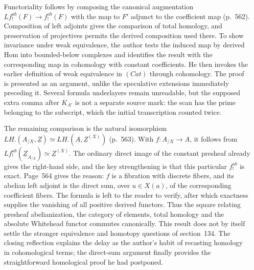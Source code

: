Functoriality follows by composing the canonical augmentation $Lf^{ab}_{!}(F)\to f^{ab}_{!}(F)$ with the map to $F'$ adjunct to the coefficient map (p.~562). Composition of left adjoints gives the comparison of total homology, and preservation of projectives permits the derived composition used there. To show invariance under weak equivalence, the author tests the induced map by derived Hom into bounded-below complexes and identifies the result with the corresponding map in cohomology with constant coefficients. He then invokes the earlier definition of weak equivalence in $(Cat)$ through cohomology. The proof is presented as an argument, unlike the speculative extensions immediately preceding it. Several formula underlayers remain unreadable, but the supposed extra comma after $K_{A'}$ is not a separate source mark: the scan has the prime belonging to the subscript, which the initial transcription counted twice.

The remaining comparison is the natural isomorphism $LH.(A_{/X},\underline Z)\simeq LH.(A,\underline Z^{(X)})$ (p.~563). With $f:A_{/X}\to A$, it follows from $Lf^{ab}_{!}(\underline Z_{A_{/X}})\simeq\underline Z^{(X)}$. The ordinary direct image of the constant presheaf already gives the right-hand side, and the key strengthening is that this particular $f^{ab}_{!}$ is exact. Page~564 gives the reason: $f$ is a fibration with discrete fibers, and its abelian left adjoint is the direct sum, over $u\in X(a)$, of the corresponding coefficient fibers. The formula is left to the reader to verify, after which exactness supplies the vanishing of all positive derived functors. Thus the square relating presheaf abelianization, the category of elements, total homology and the absolute Whitehead functor commutes canonically. This result does not by itself settle the stronger equivalence and homotopy questions of section~134. The closing reflection explains the delay as the author's habit of recasting homology in cohomological terms; the direct-sum argument finally provides the straightforward homological proof he had postponed.

